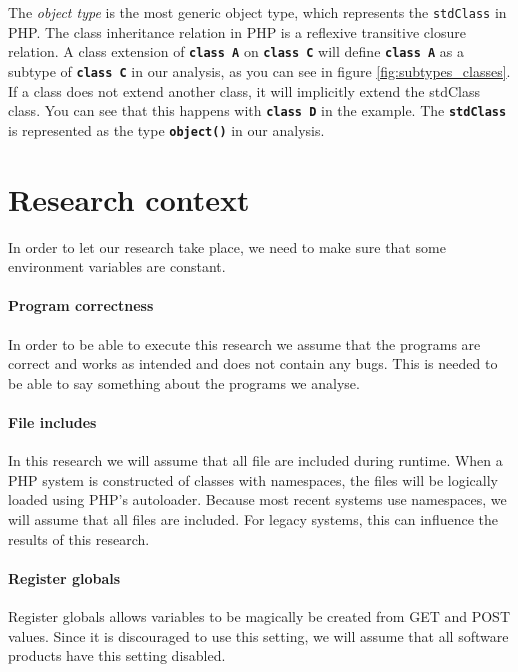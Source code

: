 \documentclass[../main.tex]{subfiles}
\begin{document}
	The \textit{object type} is the most generic object type, which represents the \texttt{stdClass} in PHP.
    The class inheritance relation in PHP is a \gls{reflexive transitive closure} relation.
    A class extension of \textbf{\texttt{class A}} on \textbf{\texttt{class C}} will define \textbf{\texttt{class A}} as a subtype of \textbf{\texttt{class C}} in our analysis, as you can see in figure \ref{fig:subtypes_classes}.
    If a class does not extend another class, it will implicitly extend the \gls{stdClass} class.
    You can see that this happens with \textbf{\texttt{class D}} in the example.
    The \textbf{\texttt{stdClass}} is represented as the type \textbf{\texttt{object()}} in our analysis.

    \section{Research context}\label{sec:research_context}
    In order to let our research take place, we need to make sure that some environment variables are constant.
    
    \paragraph{Program correctness}
    In order to be able to execute this research we assume that the programs are correct and works as intended and does not contain any bugs.
    This is needed to be able to say something about the programs we analyse.
    
    \paragraph{File includes}
    In this research we will assume that all file are included during runtime. 
    When a PHP system is constructed of classes with namespaces, the files will be logically loaded using PHP's autoloader.
    Because most recent systems use namespaces, we will assume that all files are included.
    For legacy systems, this can influence the results of this research.
    
    \paragraph{Register globals}
    Register globals allows variables to be magically be created from GET and POST values.
    Since it is discouraged to use this setting, we will assume that all software products have this setting disabled.
    
\end{document}
